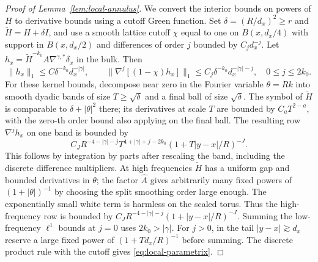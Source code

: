 \documentclass[11pt]{article}
\theoremstyle{definition}
\begin{document}
\begin{proof}[Proof of Lemma~\ref{lem:local-annulus}]
We convert the interior bounds on powers of \(H\) to derivative
bounds using a cutoff Green function. Set \(\delta=(R/d_x)^2\ge r\)
and \(\widetilde H=H+\delta I\), and use a smooth lattice
cutoff \(\chi\) equal to one on \(B(x,d_x/4)\) with support
in \(B(x,d_x/2)\) and differences of order \(j\) bounded by
\(C_jd_x^{-j}\). Let
\(h_x=\widetilde H^{-k_0} A\nabla^{\gamma,*}\delta_x\)
in the bulk. Then
\begin{equation}
 \|h_x\|_1\le C\delta^{-k_0}d_x^{-|\gamma|},
 \qquad
 \|\nabla^j[(1-\chi)h_x]\|_1
 \le C_j\delta^{-k_0}d_x^{-|\gamma|-j},\quad 0\le j\le 2k_0.
 \label{eq:local-parametrix}
\end{equation}
For these kernel bounds, decompose near zero in the Fourier
variable \(\theta=Rk\) into smooth dyadic bands of size
\(T\ge\sqrt\delta\) and a final ball of size \(\sqrt\delta\).
The symbol of \(\widetilde H\) is comparable to
\(\delta+|\theta|^2\) there; its derivatives at scale \(T\)
are bounded by \(C_a T^{2-a}\), with the zero-th order bound
also applying on the final ball. The resulting row
\(\nabla^j h_x\) on one band is bounded by
\begin{equation}
 C_JR^{-4-|\gamma|-j} T^{4+|\gamma|+j-2k_0}
           (1+T|y-x|/R)^{-J}.
\end{equation}
This follows by integration by parts after rescaling the band,
including the discrete difference multipliers. At high
frequencies \(\widetilde H\) has a uniform gap and bounded
derivatives in \(\theta\); the factor \(\widehat A\) gives
arbitrarily many fixed powers of \((1+|\theta|)^{-1}\)
by choosing the split smoothing order large enough.
The exponentially small white term is harmless on the
scaled torus. Thus the high-frequency row is bounded by
\(C_JR^{-4-|\gamma|-j}(1+|y-x|/R)^{-J}\).
Summing the low-frequency \(\ell^1\) bounds at \(j=0\)
uses \(2k_0>|\gamma|\). For \(j>0\), in the tail
\(|y-x|\gtrsim d_x\) reserve a large fixed power of
\((1+Td_x/R)^{-1}\) before summing. The discrete product
rule with the cutoff gives \eqref{eq:local-parametrix}.


\end{proof}
\end{document}
